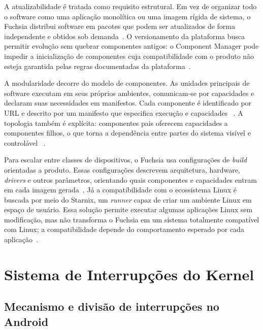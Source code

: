 \documentclass[12pt,a4paper]{article}
\begin{document}
A atualizabilidade é tratada como requisito estrutural. Em vez de organizar todo
o software como uma aplicação monolítica ou uma imagem rígida de sistema, o
Fuchsia distribui software em pacotes que podem ser atualizados de forma
independente e obtidos sob demanda~\cite{fuchsia_packages,fuchsia_updatable}. O
versionamento da plataforma busca permitir evolução sem quebrar componentes
antigos: o Component Manager pode impedir a inicialização de componentes cuja
compatibilidade com o produto não esteja garantida pelas regras documentadas da
plataforma~\cite{fuchsia_versioning}.

A modularidade decorre do modelo de componentes. As unidades principais de
software executam em seus próprios ambientes, comunicam-se por capacidades e
declaram suas necessidades em manifestos. Cada componente é identificado por URL
e descrito por um manifesto que especifica execução e capacidades
~\cite{fuchsia_components,fuchsia_components_intro}. A topologia também é
explícita: componentes pais oferecem capacidades a componentes filhos, o que
torna a dependência entre partes do sistema visível e controlável
~\cite{fuchsia_capabilities}.

Para escalar entre classes de dispositivos, o Fuchsia usa configurações de
\emph{build} orientadas a produto. Essas configurações descrevem arquitetura,
hardware, \emph{drivers} e outros parâmetros, orientando quais componentes e
capacidades entram em cada imagem gerada~\cite{fuchsia_build}. Já a
compatibilidade com o ecossistema Linux é buscada por meio do Starnix, um
\emph{runner} capaz de criar um ambiente Linux em espaço de usuário. Essa solução
permite executar algumas aplicações Linux sem modificação, mas não transforma o
Fuchsia em um sistema totalmente compatível com Linux; a compatibilidade depende
do comportamento esperado por cada aplicação~\cite{starnix}.

\section{Sistema de Interrupções do Kernel}
\label{sec:interrupcoes}

\subsection{Mecanismo e divisão de interrupções no Android}
\end{document}
